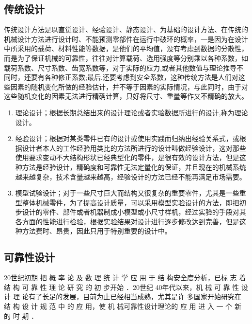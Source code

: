 \documentclass[a4paper,12pt]{article}
\begin{document}
\subsection{传统设计}
传统设计方法是以直觉设计、经验设计、静态设计、为基础的设计方法、在传统的机械设计方法进行设计时、不能预测零部件在运行中破环的概率，一是因为在设计中所采用的载荷、材料性能等数据，是他们的平均值，没有考虑到数据的分散性，而是为了保证机械的可靠性，往往对计算载荷、选用强度等分别乘以各种系数，如载荷系数、尺寸系数、齿宽系数等，对于实际的应力,或者其他数值与理论推导不同时，还要有各种修正系数;最后,还要考虑到安全系数，这种传统方法是人们对这些因素的随机变化所做的经验估计，并不等于因素的实际情况，与此同时，由于对这些随机变化的因素无法进行精确计算，只好将尺寸、重量等作又不精确的放大。
\begin{enumerate}
	\item 理论设计；根据长期总结出来的设计理论或者实验数据所进行的设计,称为理论设计。
	\item 经验设计；根据对某类零件已有的设计或使用实践而归纳出经验关系式，或根据设计者本人的工作经验用类比的方法所进行的设计叫做经验设计，这对那些使用要求变动不大结构形状已经典型化的零件，是很有效的设计方法，但是这种方法是经验设计，精确度和可靠性无法定量化的保证，并且现在的机械系统越来越复杂，技术含量越来越高，经验设计的方法已经不能再满足市场需要。
	\item 模型试验设计；对于一些尺寸巨大而结构又很复杂的重要零件，尤其是一些重型整体机械零件，为了提高设计质量，可以采用模型实验设计的方法，即把初步设计的零件、部件或者机器制成小模型或小尺寸样机，经过实验的手段对其各方面的性能进行检验，根据实验结果对设计进行逐步修改达到完善，但是这种方法费时、昂贵，因此只用于特别重要的设计中。
\end{enumerate}


\subsection{可靠性设计}
20世纪初期 把 概 率 论 及 数 理 统 计 学 应 用 于 结 构安全度分析，已标 志 着 结 构 可 靠 性 理 论 研 究 的 初 步开始 ．20世纪 40年代以来，机 械 可 靠 性 设 计 理 论有了长足的发展，目前为止已经相当成熟，尤其是许 多国家开始研究在 结 构 设 计 规 范 中 的 应 用，使 机 械可靠性设计理论的 应 用 进 入 一 个 新 的 时 期 ．
\end{document}
